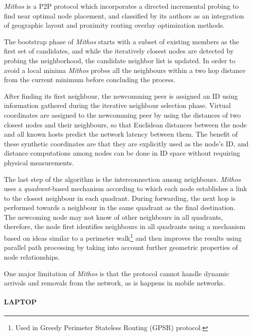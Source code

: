 \documentclass[acmcsur]{acmtrans2m}
\begin{document}
\textit{Mithos} \cite{waldvogel_mythos_2003} is a P2P protocol which
incorporates a directed incremental probing to find near optimal node placement,
and classified by its authors as an integration of geographic layout
and proximity routing overlay optimization methods.

The bootstrap phase of \textit{Mithos} starts with a subset of existing members
as the first set of candidates, and while the iteratively closest nodes are
detected by probing the neighborhood, the candidate neighbor list is updated. In
order to avoid a local minima \textit{Mithos} probes all the neighbours within a
two hop distance from the current minimum before concluding the process.

After finding its first neighbour, the newcomming peer is assigned an ID using
information gathered during the iterative neighbour selection phase. Virtual
coordinates are assigned to the newcomming peer by using the distances of two
closest nodes and their neighbours, so that Euclidean distances between the node
and all known hosts predict the network latency between
them\cite{cox_vivaldi_2004}.  The benefit of these synthetic coordinates are
that they are explicitly used as the node's ID, and distance computations among
nodes can be done in ID space without requiring physical measurements.

The last step of the algorithm is the interconnection among neighbours.
\emph{Mithos} uses a \emph{quadrant}-based mechanism according to which each
node establishes a link to the closest neighbour in each quadrant. During
forwarding, the next hop is performed towards a neighbour in the same quadrant
as the final destination. The newcoming node may not know of other neighbours
in all quadrants, therefore, the node first identifies neighbours in all
quadrants using a mechanism based on ideas similar to a perimeter
walk\footnote{Used in Greedy Perimeter Stateless Routing (GPSR) protocol.} and
then improves the results using parallel path processing by taking into account
further geometric properties of node relationships.

One major limitation of \textit{Mithos} is that the protocol cannot handle
dynamic arrivals and removals from the network, as is happens in mobile
networks.

\paragraph*{\bf LAPTOP}
\end{document}

